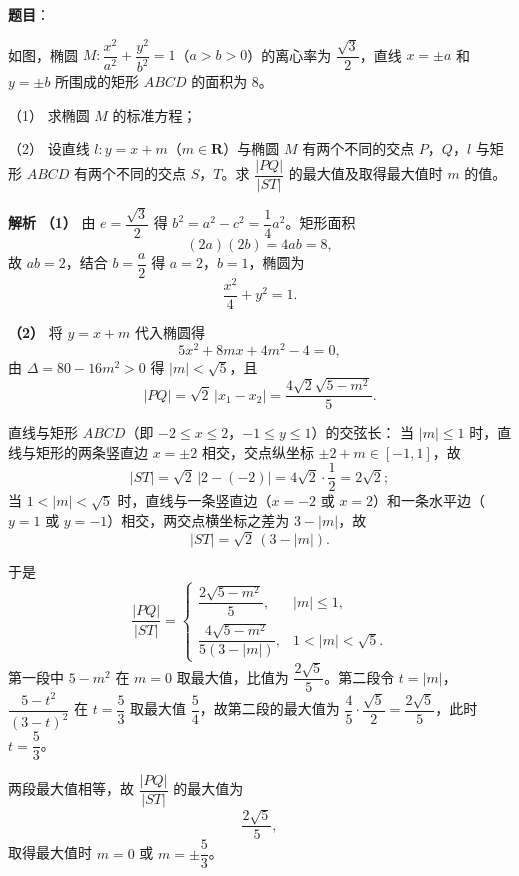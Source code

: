 \begin{answer}

\textbf{题目}：

如图，椭圆 $M:\dfrac{x^2}{a^2}+\dfrac{y^2}{b^2}=1$（$a>b>0$）的离心率为 $\dfrac{\sqrt3}2$，直线 $x=\pm a$ 和 $y=\pm b$ 所围成的矩形 $ABCD$ 的面积为 $8$。

（1） 求椭圆 $M$ 的标准方程；

（2） 设直线 $l:y=x+m$（$m\in\mathbf R$）与椭圆 $M$ 有两个不同的交点 $P$，$Q$，$l$ 与矩形 $ABCD$ 有两个不同的交点 $S$，$T$。求 $\dfrac{|PQ|}{|ST|}$ 的最大值及取得最大值时 $m$ 的值。
\nopagebreak[4]
\begin{center}\end{center}
\nopagebreak[4]
\textbf{解析}
\textbf{（1）} 由 $e=\dfrac{\sqrt3}2$ 得 $b^2=a^2-c^2=\dfrac14a^2$。矩形面积
\nopagebreak[4]
\[(2a)(2b)=4ab=8,\]
故 $ab=2$，结合 $b=\dfrac a2$ 得 $a=2$，$b=1$，椭圆为
\nopagebreak[4]
\[\frac{x^2}4+y^2=1.\]

\textbf{（2）} 将 $y=x+m$ 代入椭圆得
\nopagebreak[4]
\[5x^2+8mx+4m^2-4=0,\]
由 $\Delta=80-16m^2>0$ 得 $|m|<\sqrt5$，且
\nopagebreak[4]
\[|PQ|=\sqrt2\,|x_1-x_2|=\frac{4\sqrt2\sqrt{5-m^2}}5.\]

直线与矩形 $ABCD$（即 $-2\leqslant x\leqslant2$，$-1\leqslant y\leqslant1$）的交弦长：
当 $|m|\leqslant1$ 时，直线与矩形的两条竖直边 $x=\pm2$ 相交，交点纵坐标 $\pm2+m\in[-1,1]$，故
\nopagebreak[4]
\[|ST|=\sqrt2\,|2-(-2)|=4\sqrt2\cdot\frac{1}{2}=2\sqrt2;\]
当 $1<|m|<\sqrt5$ 时，直线与一条竖直边（$x=-2$ 或 $x=2$）和一条水平边（$y=1$ 或 $y=-1$）相交，两交点横坐标之差为 $3-|m|$，故
\nopagebreak[4]
\[|ST|=\sqrt2\,(3-|m|).\]

于是
\nopagebreak[4]
\[\frac{|PQ|}{|ST|}=\begin{cases}\dfrac{2\sqrt{5-m^2}}5,&|m|\leqslant1,\\[6pt]\dfrac{4\sqrt{5-m^2}}{5(3-|m|)},&1<|m|<\sqrt5.\end{cases}\]
第一段中 $5-m^2$ 在 $m=0$ 取最大值，比值为 $\dfrac{2\sqrt5}5$。第二段令 $t=|m|$，$\dfrac{5-t^2}{(3-t)^2}$ 在 $t=\dfrac53$ 取最大值 $\dfrac54$，故第二段的最大值为 $\dfrac45\cdot\dfrac{\sqrt5}2=\dfrac{2\sqrt5}5$，此时 $t=\dfrac53$。

两段最大值相等，故 $\dfrac{|PQ|}{|ST|}$ 的最大值为
\nopagebreak[4]
\[\frac{2\sqrt5}5,\]
取得最大值时 $m=0$ 或 $m=\pm\dfrac53$。



\end{answer}
